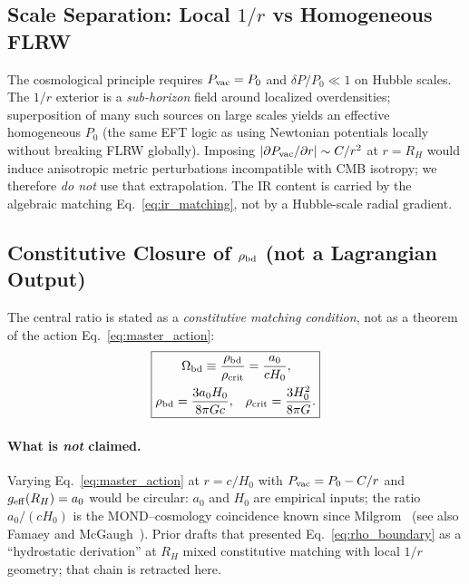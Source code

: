 \documentclass[prd,
               reprint,
               aps,
               preprintnumbers,
               nofootinbib,
               longbibliography,
               floatfix]{revtex4-2}
\begin{document}

\subsection{Scale Separation: Local \texorpdfstring{$1/r$}{1/r}
vs Homogeneous FLRW}
\label{sec:scale_separation}

The cosmological principle requires $P_{\rm vac}=P_0$ and
$\delta P/P_0\ll 1$ on Hubble scales.
The $1/r$ exterior is a \emph{sub-horizon} field around
localized overdensities; superposition of many such
sources on large scales yields an effective homogeneous
$P_0$ (the same EFT logic as using Newtonian potentials
locally without breaking FLRW globally).
Imposing $|\partial P_{\rm vac}/\partial r|\sim C/r^2$
at $r=R_H$ would induce anisotropic metric perturbations
incompatible with CMB isotropy; we therefore \emph{do not}
use that extrapolation.
The IR content is carried by the algebraic matching
Eq.~\eqref{eq:ir_matching}, not by a Hubble-scale
radial gradient.


\subsection{Constitutive Closure of \texorpdfstring{$\rho_{\rm bd}$}{rho\_bd}
(not a Lagrangian Output)}
\label{sec:constitutive_closure}

The central ratio is stated as a \emph{constitutive
matching condition}, not as a theorem of the action
Eq.~\eqref{eq:master_action}:
\begin{equation}
\label{eq:rho_boundary}
\boxed{
\begin{aligned}
\Omega_{\rm bd} \equiv \frac{\rho_{\rm bd}}{\rho_{\rm crit}} 
&= \frac{a_0}{cH_0}, \\
\rho_{\rm bd} = \frac{3a_0 H_0}{8\pi G c}, \quad 
&\rho_{\rm crit}=\frac{3H_0^2}{8\pi G}.
\end{aligned}
}
\end{equation}

\paragraph{What is \emph{not} claimed.}
Varying Eq.~\eqref{eq:master_action} at $r=c/H_0$ with
$P_{\rm vac}=P_0-C/r$ and $g_{\rm eff}(R_H)=a_0$ would be
circular: $a_0$ and $H_0$ are empirical inputs; the ratio
$a_0/(cH_0)$ is the MOND--cosmology coincidence known since
Milgrom~\cite{Milgrom1983} (see also Famaey and
McGaugh~\cite{Famaey2012}).
Prior drafts that presented Eq.~\eqref{eq:rho_boundary} as a
``hydrostatic derivation'' at $R_H$ mixed constitutive
matching with local $1/r$ geometry; that chain is
retracted here.
\end{document}
